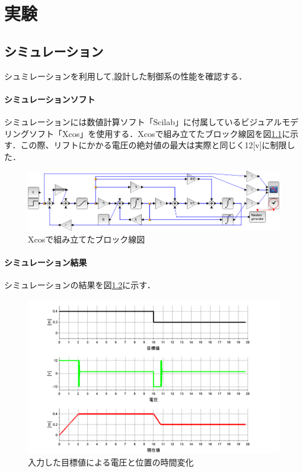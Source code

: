 \chapter{実験}
\section{シミュレーション}
シュミレーションを利用して,設計した制御系の性能を確認する．

\subsubsection{シミュレーションソフト}
シミュレーションには数値計算ソフト「Scilab」に付属しているビジュアルモデリングソフト「Xcos」を使用する．Xcosで組み立てたブロック線図を図\ref{fig:blockXcos}に示す．この際、リフトにかかる電圧の絶対値の最大は実際と同じく12[v]に制限した．

\begin{figure}[htbp]
  \begin{center}
    \includegraphics[width=150mm]{img/blockXcos.png}
    \end{center}
  \caption{Xcosで組み立てたブロック線図}
 \label{fig:blockXcos}
\end{figure}

\subsubsection{シミュレーション結果}
シミュレーションの結果を図\ref{fig:sim}に示す．

\begin{figure}[htbp]
 \begin{center}
    \includegraphics[width=150mm]{img/sim.bmp}
    \end{center}
  \caption{入力した目標値による電圧と位置の時間変化}
 \label{fig:sim}
\end{figure}

